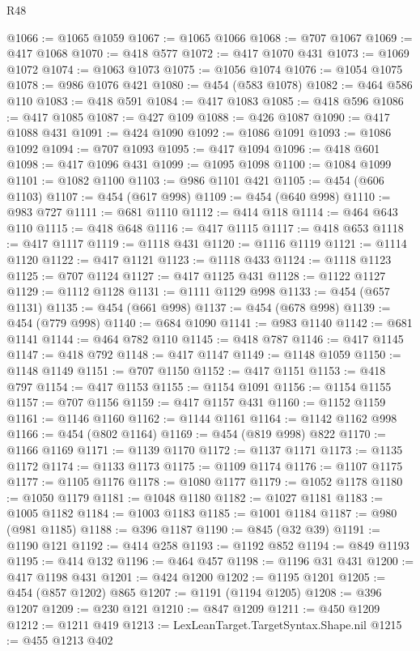 \begin{lexlean}{R48}
\begin{coremodule}
@1066 := @1065 @1059
@1067 := @1065 @1066
@1068 := @707 @1067
@1069 := @417 @1068
@1070 := @418 @577
@1072 := @417 @1070 @431
@1073 := @1069 @1072
@1074 := @1063 @1073
@1075 := @1056 @1074
@1076 := @1054 @1075
@1078 := @986 @1076 @421
@1080 := @454 (@583 @1078)
@1082 := @464 @586 @110
@1083 := @418 @591
@1084 := @417 @1083
@1085 := @418 @596
@1086 := @417 @1085
@1087 := @427 @109
@1088 := @426 @1087
@1090 := @417 @1088 @431
@1091 := @424 @1090
@1092 := @1086 @1091
@1093 := @1086 @1092
@1094 := @707 @1093
@1095 := @417 @1094
@1096 := @418 @601
@1098 := @417 @1096 @431
@1099 := @1095 @1098
@1100 := @1084 @1099
@1101 := @1082 @1100
@1103 := @986 @1101 @421
@1105 := @454 (@606 @1103)
@1107 := @454 (@617 @998)
@1109 := @454 (@640 @998)
@1110 := @983 @727
@1111 := @681 @1110
@1112 := @414 @118
@1114 := @464 @643 @110
@1115 := @418 @648
@1116 := @417 @1115
@1117 := @418 @653
@1118 := @417 @1117
@1119 := @1118 @431
@1120 := @1116 @1119
@1121 := @1114 @1120
@1122 := @417 @1121
@1123 := @1118 @433
@1124 := @1118 @1123
@1125 := @707 @1124
@1127 := @417 @1125 @431
@1128 := @1122 @1127
@1129 := @1112 @1128
@1131 := @1111 @1129 @998
@1133 := @454 (@657 @1131)
@1135 := @454 (@661 @998)
@1137 := @454 (@678 @998)
@1139 := @454 (@779 @998)
@1140 := @684 @1090
@1141 := @983 @1140
@1142 := @681 @1141
@1144 := @464 @782 @110
@1145 := @418 @787
@1146 := @417 @1145
@1147 := @418 @792
@1148 := @417 @1147
@1149 := @1148 @1059
@1150 := @1148 @1149
@1151 := @707 @1150
@1152 := @417 @1151
@1153 := @418 @797
@1154 := @417 @1153
@1155 := @1154 @1091
@1156 := @1154 @1155
@1157 := @707 @1156
@1159 := @417 @1157 @431
@1160 := @1152 @1159
@1161 := @1146 @1160
@1162 := @1144 @1161
@1164 := @1142 @1162 @998
@1166 := @454 (@802 @1164)
@1169 := @454 (@819 @998) @822
@1170 := @1166 @1169
@1171 := @1139 @1170
@1172 := @1137 @1171
@1173 := @1135 @1172
@1174 := @1133 @1173
@1175 := @1109 @1174
@1176 := @1107 @1175
@1177 := @1105 @1176
@1178 := @1080 @1177
@1179 := @1052 @1178
@1180 := @1050 @1179
@1181 := @1048 @1180
@1182 := @1027 @1181
@1183 := @1005 @1182
@1184 := @1003 @1183
@1185 := @1001 @1184
@1187 := @980 (@981 @1185)
@1188 := @396 @1187
@1190 := @845 (@32 @39)
@1191 := @1190 @121
@1192 := @414 @258
@1193 := @1192 @852
@1194 := @849 @1193
@1195 := @414 @132
@1196 := @464 @457
@1198 := @1196 @31 @431
@1200 := @417 @1198 @431
@1201 := @424 @1200
@1202 := @1195 @1201
@1205 := @454 (@857 @1202) @865
@1207 := @1191 (@1194 @1205)
@1208 := @396 @1207
@1209 := @230 @121
@1210 := @847 @1209
@1211 := @450 @1209
@1212 := @1211 @419
@1213 := LexLeanTarget.TargetSyntax.Shape.nil
@1215 := @455 @1213 @402

\end{coremodule}
\end{lexlean}
